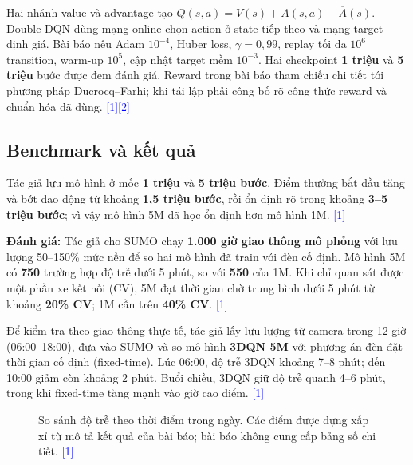 \documentclass[11pt,a4paper,headings=small,parskip=half]{scrartcl}
\newcommand{\src}[1]{\textcolor{blue}{[#1]}}
\begin{document}
Hai nhánh value và advantage tạo $Q(s,a)=V(s)+A(s,a)-\overline{A}(s)$. Double DQN dùng mạng online chọn action ở state tiếp theo và mạng target định giá. Bài báo nêu Adam $10^{-4}$, Huber loss, $\gamma=0{,}99$, replay tối đa $10^6$ transition, warm-up $10^5$, cập nhật target mềm $10^{-3}$. Hai checkpoint \textbf{1 triệu} và \textbf{5 triệu} bước được đem đánh giá. Reward trong bài báo tham chiếu chi tiết tới phương pháp Ducrocq--Farhi; khi tái lập phải công bố rõ công thức reward và chuẩn hóa đã dùng. \src{1}\src{2}

\subsection{Benchmark và kết quả}
Tác giả lưu mô hình ở mốc \textbf{1 triệu} và \textbf{5 triệu bước}. Điểm thưởng bắt đầu tăng và bớt dao động từ khoảng \textbf{1,5 triệu bước}, rồi ổn định rõ trong khoảng \textbf{3--5 triệu bước}; vì vậy mô hình 5M đã học ổn định hơn mô hình 1M. \src{1}

\textbf{Đánh giá:} Tác giả cho SUMO chạy \textbf{1.000 giờ giao thông mô phỏng} với lưu lượng 50--150\% mức nền để so hai mô hình đã train với đèn cố định. Mô hình 5M có \textbf{750} trường hợp độ trễ dưới 5 phút, so với \textbf{550} của 1M. Khi chỉ quan sát được một phần xe kết nối (CV), 5M đạt thời gian chờ trung bình dưới 5 phút từ khoảng \textbf{20\% CV}; 1M cần trên \textbf{40\% CV}. \src{1}

Để kiểm tra theo giao thông thực tế, tác giả lấy lưu lượng từ camera trong 12 giờ (06:00--18:00), đưa vào SUMO và so mô hình \textbf{3DQN 5M} với phương án đèn đặt thời gian cố định (fixed-time). Lúc 06:00, độ trễ 3DQN khoảng 7--8 phút; đến 10:00 giảm còn khoảng 2 phút. Buổi chiều, 3DQN giữ độ trễ quanh 4--6 phút, trong khi fixed-time tăng mạnh vào giờ cao điểm. \src{1}

\begin{figure}[H]\centering
{}
\caption{So sánh độ trễ theo thời điểm trong ngày. Các điểm được dựng xấp xỉ từ mô tả kết quả của bài báo; bài báo không cung cấp bảng số chi tiết. \src{1}}
\end{figure}
\end{document}
